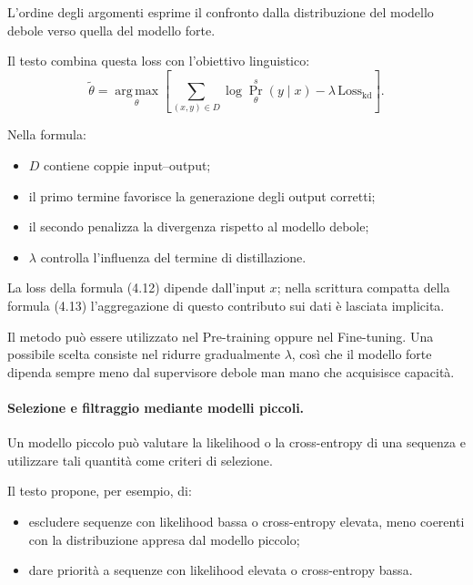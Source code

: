 L'ordine degli argomenti esprime
il confronto dalla distribuzione
del modello debole verso quella
del modello forte.

Il testo combina questa loss
con l'obiettivo linguistico:
\[
\tilde{\theta}
=
\operatorname*{arg\,max}_{\theta}
\left[
\sum_{(x,y)\in D}
\log \Pr^{s}_{\theta}(y\mid x)
-
\lambda\,\mathrm{Loss}_{\mathrm{kd}}
\right].
\tag{4.13}
\]

Nella formula:

\begin{itemize}
    \item $D$ contiene coppie input--output;

    \item il primo termine favorisce
    la generazione degli output corretti;

    \item il secondo penalizza la divergenza
    rispetto al modello debole;

    \item $\lambda$ controlla l'influenza
    del termine di distillazione.
\end{itemize}

La loss della formula (4.12) dipende dall'input $x$;
nella scrittura compatta della formula (4.13)
l'aggregazione di questo contributo
sui dati è lasciata implicita.

Il metodo può essere utilizzato
nel Pre-training oppure nel Fine-tuning.
Una possibile scelta consiste
nel ridurre gradualmente $\lambda$,
così che il modello forte dipenda
sempre meno dal supervisore debole
man mano che acquisisce capacità.

\paragraph{Selezione e filtraggio mediante modelli piccoli.}
Un modello piccolo può valutare
la likelihood o la cross-entropy
di una sequenza e utilizzare tali quantità
come criteri di selezione.

Il testo propone, per esempio, di:

\begin{itemize}
    \item escludere sequenze con likelihood bassa
    o cross-entropy elevata,
    meno coerenti con la distribuzione
    appresa dal modello piccolo;

    \item dare priorità a sequenze
    con likelihood elevata
    o cross-entropy bassa.
\end{itemize}

